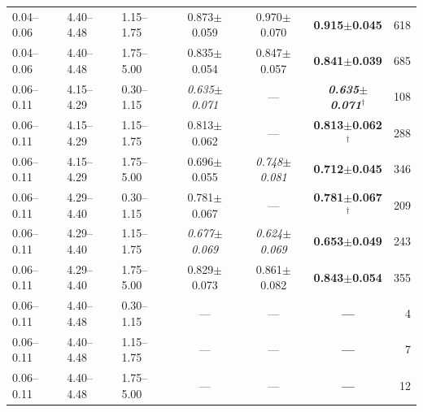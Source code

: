 \begin{tabular}{lllcccr}
0.04--0.06 & 4.40--4.48 & 1.15--1.75 & 0.873$\pm$0.059 & 0.970$\pm$0.070 & \textbf{0.915$\pm$0.045} & 618 \\
0.04--0.06 & 4.40--4.48 & 1.75--5.00 & 0.835$\pm$0.054 & 0.847$\pm$0.057 & \textbf{0.841$\pm$0.039} & 685 \\
0.06--0.11 & 4.15--4.29 & 0.30--1.15 & \textit{0.635$\pm$0.071} & --- & \textbf{\textit{0.635$\pm$0.071}$^\dagger$} & 108 \\
0.06--0.11 & 4.15--4.29 & 1.15--1.75 & 0.813$\pm$0.062 & --- & \textbf{0.813$\pm$0.062$^\dagger$} & 288 \\
0.06--0.11 & 4.15--4.29 & 1.75--5.00 & 0.696$\pm$0.055 & \textit{0.748$\pm$0.081} & \textbf{0.712$\pm$0.045} & 346 \\
0.06--0.11 & 4.29--4.40 & 0.30--1.15 & 0.781$\pm$0.067 & --- & \textbf{0.781$\pm$0.067$^\dagger$} & 209 \\
0.06--0.11 & 4.29--4.40 & 1.15--1.75 & \textit{0.677$\pm$0.069} & \textit{0.624$\pm$0.069} & \textbf{0.653$\pm$0.049} & 243 \\
0.06--0.11 & 4.29--4.40 & 1.75--5.00 & 0.829$\pm$0.073 & 0.861$\pm$0.082 & \textbf{0.843$\pm$0.054} & 355 \\
0.06--0.11 & 4.40--4.48 & 0.30--1.15 & --- & --- & \textbf{---} & 4 \\
0.06--0.11 & 4.40--4.48 & 1.15--1.75 & --- & --- & \textbf{---} & 7 \\
0.06--0.11 & 4.40--4.48 & 1.75--5.00 & --- & --- & \textbf{---} & 12 \\
\bottomrule\end{tabular}

\medskip


